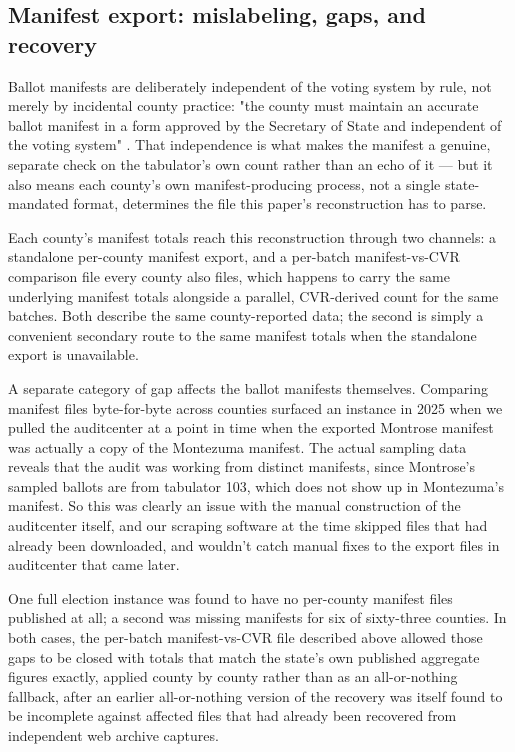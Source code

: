 \subsection{Manifest export: mislabeling, gaps, and recovery}

Ballot manifests are deliberately independent of the voting system by
rule, not merely by incidental county practice: "the county must maintain
an accurate ballot manifest in a form approved by the Secretary of State
and independent of the voting system" \cite{corules2026}. That
independence is what makes the manifest a genuine, separate check on the
tabulator's own count rather than an echo of it — but it also means each
county's own manifest-producing process, not a single state-mandated
format, determines the file this paper's reconstruction has to parse.

Each county's manifest totals reach this reconstruction through two
channels: a standalone per-county manifest export, and a per-batch
manifest-vs-CVR comparison file every county also files, which happens to
carry the same underlying manifest totals alongside a parallel,
CVR-derived count for the same batches. Both describe the same
county-reported data; the second is simply a convenient secondary route
to the same manifest totals when the standalone export is unavailable.

A separate category of gap affects the ballot manifests themselves.
Comparing manifest files byte-for-byte
across counties surfaced an instance in 2025 when we pulled the auditcenter
at a point in time when the exported Montrose manifest was actually a
copy of the Montezuma manifest. The actual sampling data reveals that
the audit was working from distinct manifests, since Montrose's sampled
ballots are from tabulator 103, which does not show up in Montezuma's manifest.
So this was clearly
an issue with the manual construction of the auditcenter itself,
and our scraping software at the time skipped files that
had already been downloaded, and wouldn't catch manual fixes to
the export files in auditcenter that came later.

One full election instance was found to have no per-county manifest files
published at all; a second was missing manifests for six of sixty-three
counties. In both cases, the per-batch manifest-vs-CVR file described
above allowed those gaps to be closed with totals that match the state's
own published aggregate figures exactly, applied county by county rather
than as an all-or-nothing fallback, after an earlier all-or-nothing
version of the recovery was itself found to be incomplete against
affected files that had already been recovered from independent web
archive captures.

